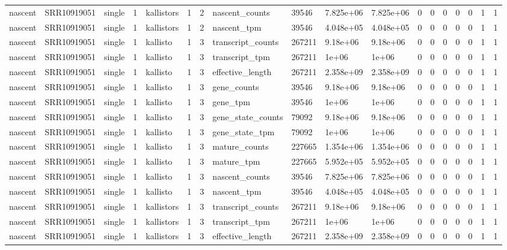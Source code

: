 \begin{tabular}{llllllllllllllllll}
nascent & SRR10919051 & single & 1 & kallistors & 1 & 2 & nascent\_counts & 39546 & 7.825e+06 & 7.825e+06 & 0 & 0 & 0 & 0 & 0 & 1 & 1 \\
nascent & SRR10919051 & single & 1 & kallistors & 1 & 2 & nascent\_tpm & 39546 & 4.048e+05 & 4.048e+05 & 0 & 0 & 0 & 0 & 0 & 1 & 1 \\
nascent & SRR10919051 & single & 1 & kallisto & 1 & 3 & transcript\_counts & 267211 & 9.18e+06 & 9.18e+06 & 0 & 0 & 0 & 0 & 0 & 1 & 1 \\
nascent & SRR10919051 & single & 1 & kallisto & 1 & 3 & transcript\_tpm & 267211 & 1e+06 & 1e+06 & 0 & 0 & 0 & 0 & 0 & 1 & 1 \\
nascent & SRR10919051 & single & 1 & kallisto & 1 & 3 & effective\_length & 267211 & 2.358e+09 & 2.358e+09 & 0 & 0 & 0 & 0 & 0 & 1 & 1 \\
nascent & SRR10919051 & single & 1 & kallisto & 1 & 3 & gene\_counts & 39546 & 9.18e+06 & 9.18e+06 & 0 & 0 & 0 & 0 & 0 & 1 & 1 \\
nascent & SRR10919051 & single & 1 & kallisto & 1 & 3 & gene\_tpm & 39546 & 1e+06 & 1e+06 & 0 & 0 & 0 & 0 & 0 & 1 & 1 \\
nascent & SRR10919051 & single & 1 & kallisto & 1 & 3 & gene\_state\_counts & 79092 & 9.18e+06 & 9.18e+06 & 0 & 0 & 0 & 0 & 0 & 1 & 1 \\
nascent & SRR10919051 & single & 1 & kallisto & 1 & 3 & gene\_state\_tpm & 79092 & 1e+06 & 1e+06 & 0 & 0 & 0 & 0 & 0 & 1 & 1 \\
nascent & SRR10919051 & single & 1 & kallisto & 1 & 3 & mature\_counts & 227665 & 1.354e+06 & 1.354e+06 & 0 & 0 & 0 & 0 & 0 & 1 & 1 \\
nascent & SRR10919051 & single & 1 & kallisto & 1 & 3 & mature\_tpm & 227665 & 5.952e+05 & 5.952e+05 & 0 & 0 & 0 & 0 & 0 & 1 & 1 \\
nascent & SRR10919051 & single & 1 & kallisto & 1 & 3 & nascent\_counts & 39546 & 7.825e+06 & 7.825e+06 & 0 & 0 & 0 & 0 & 0 & 1 & 1 \\
nascent & SRR10919051 & single & 1 & kallisto & 1 & 3 & nascent\_tpm & 39546 & 4.048e+05 & 4.048e+05 & 0 & 0 & 0 & 0 & 0 & 1 & 1 \\
nascent & SRR10919051 & single & 1 & kallistors & 1 & 3 & transcript\_counts & 267211 & 9.18e+06 & 9.18e+06 & 0 & 0 & 0 & 0 & 0 & 1 & 1 \\
nascent & SRR10919051 & single & 1 & kallistors & 1 & 3 & transcript\_tpm & 267211 & 1e+06 & 1e+06 & 0 & 0 & 0 & 0 & 0 & 1 & 1 \\
nascent & SRR10919051 & single & 1 & kallistors & 1 & 3 & effective\_length & 267211 & 2.358e+09 & 2.358e+09 & 0 & 0 & 0 & 0 & 0 & 1 & 1 \\

\end{tabular}
